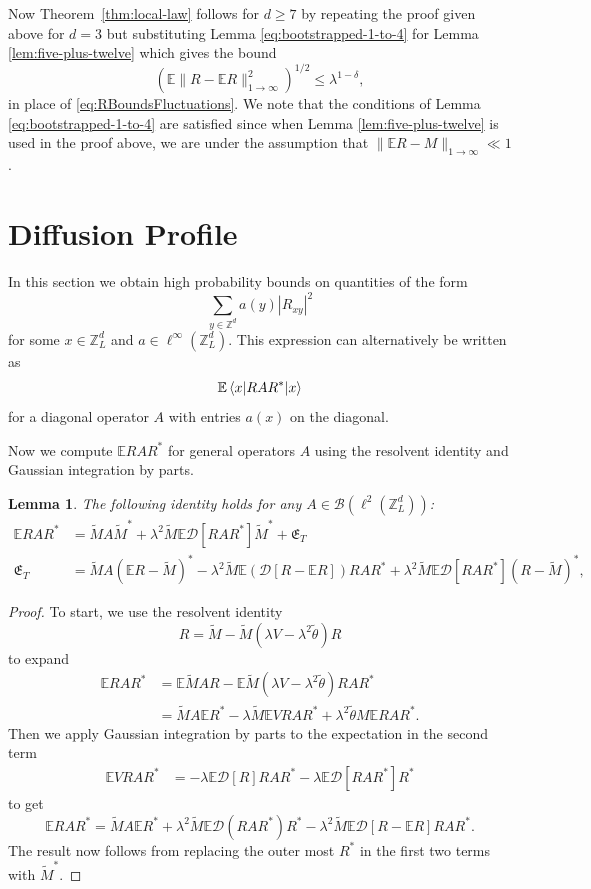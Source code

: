 \documentclass[11pt]{amsart}
\def\bbZ{{\mathbb Z}}
\def\Z{{\mathbb{Z}}}
\def\Expec{{\mathbb E}}
\def\braket#1{\mathinner{\langle{#1}\rangle}}
\newcommand{\mcal}[1]{{\mathcal{#1}}}
\numberwithin{equation}{section}
\numberwithin{theorem}{section}
\newtheorem{lemma}[theorem]{Lemma}
\begin{document}
Now Theorem~\ref{thm:local-law} follows for $d\geq 7$ by repeating the proof given above
for $d=3$ but substituting Lemma \ref{eq:bootstrapped-1-to-4}
for Lemma \ref{lem:five-plus-twelve} which gives the bound
$$(\mathbb{E}\|R-\mathbb{E}R\|_{1\to\infty}^2)^{1/2}\leq \lambda^{1-\delta},$$
in place of \eqref{eq:RBoundsFluctuations}. We note that the conditions of Lemma \ref{eq:bootstrapped-1-to-4}
are satisfied since when Lemma
\ref{lem:five-plus-twelve} is used in the proof above, we are under the assumption that $\|\mathbb{E}R-M\|_{1\to\infty}\ll 1$.

\section{Diffusion Profile}
\label{sec:diffusion-profile}
In this section we obtain high probability bounds on quantities of the form
\begin{equation}
\label{eq:second-moment-sum}
\sum_{y\in \Z^d} a(y) |R_{xy}|^2
\end{equation}
for some $x\in\bbZ^d_L$ and $a \in \ell^\infty(\bbZ^d_L)$.  This expression can alternatively be written as
\[
\Expec \braket{x|RA R^*|x}
\]
for a diagonal operator $A$ with entries $a(x)$ on the diagonal.

Now  we compute $\Expec RAR^*$ for general operators $A$ using the resolvent identity and Gaussian integration by parts.
\begin{lemma}
\label{lem:T-eq-full}
The following identity holds for any $A\in \mcal{B}(\ell^2(\bbZ^d_L))$:
\begin{align*}
\Expec RAR^* &= \tilde{M}A\tilde{M}^* + \lambda^2 \tilde{M} \Expec \mcal{D}[RAR^*] \tilde{M}^*
+ \mathfrak{E}_T \\
\mathfrak{E}_T &= \tilde{M} A (\Expec R - \tilde{M})^*
- \lambda^2 \tilde{M} \Expec (\mcal{D}[R-\Expec R]) RAR^* + \lambda^2
\tilde{M} \Expec \mcal{D}[RAR^*] (R-\tilde{M})^*,
\end{align*}
\end{lemma}
\begin{proof}
To start, we use the resolvent identity
\[
R = \tilde{M} - \tilde{M} (\lambda V - \lambda^2\tilde{\theta}) R
\]
to expand
\begin{align*}
\Expec RAR^*
& = \Expec \tilde{M}AR - \Expec \tilde{M}(\lambda V- \lambda^2\tilde{\theta})RAR^*\\
& = \tilde{M}A\Expec R^*- \lambda \tilde{M}\Expec VRAR^* + \lambda^2 \tilde{\theta} M \Expec RAR^* .
\end{align*}
Then we apply Gaussian integration by parts to the expectation in the second term
\begin{align*}
\mathbb{E}VRAR^{\ast}
& = -\lambda \mathbb{E}\mathcal{D}[R]RAR^{\ast} - \lambda\mathbb{E}\mathcal{D}[RAR^{\ast}]R^{\ast}
\end{align*}
to get
$$\mathbb{E}RAR^{\ast} = \tilde{M}A\mathbb{E}R^{\ast} + \lambda^2 \tilde{M}\mathbb{E}\mathcal{D}(RAR^{\ast})R^{\ast} - \lambda^2\tilde{M}\mathbb{E}\mathcal{D}[R-\Expec R]RAR^{\ast}.$$
The result now follows from replacing the outer most $R^{\ast}$ in the first two terms with $\tilde{M}^*$.
\end{proof}
\end{document}
